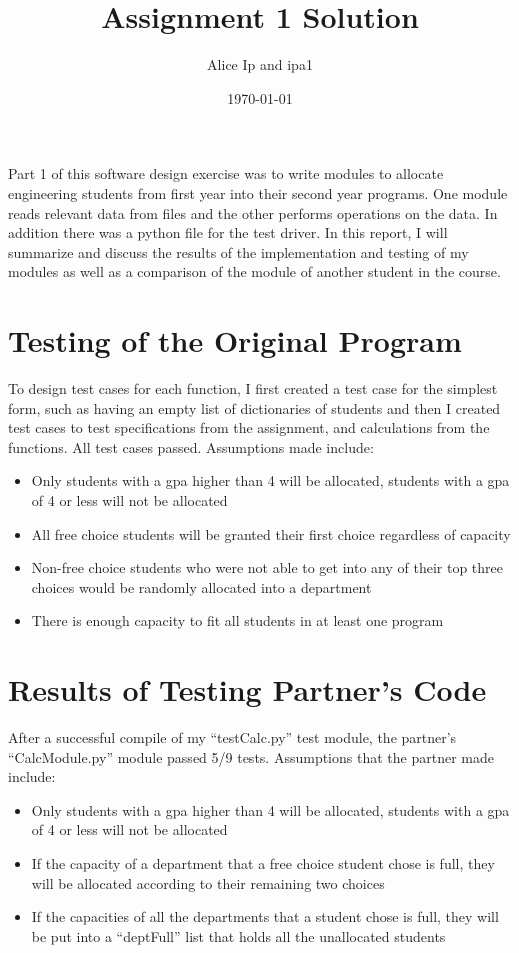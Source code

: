 \documentclass[12pt]{article}
\title{Assignment 1 Solution}
\author{Alice Ip and ipa1}
\date{\today}
\begin{document}
\maketitle

Part 1 of this software design exercise was to write modules to allocate engineering students from first year into their second year programs. One module reads relevant data from files and the other performs operations on the data. In addition there was a python file for the test driver. In this report, I will summarize and discuss the results of the implementation and testing of my modules as well as a comparison of the module of another student in the course.

\section{Testing of the Original Program}

To design test cases for each function, I first created a test case for the simplest form, such as having an empty list of dictionaries of students and then I created test cases to test specifications from the assignment, and calculations from the functions. All test cases passed. Assumptions made include:

\begin{itemize}
\item Only students with a gpa higher than 4 will be allocated, students with a gpa of 4 or less will not be allocated
\item All free choice students will be granted their first choice regardless of capacity
\item Non-free choice students who were not able to get into any of their top three choices would be randomly allocated into a department
\item There is enough capacity to fit all students in at least one program
\end{itemize}



\section{Results of Testing Partner's Code}

After a successful compile of my ``testCalc.py'' test module, the partner's ``CalcModule.py'' module passed 5/9 tests. Assumptions that the partner made include:

\begin{itemize}

\item Only students with a gpa higher than 4 will be allocated, students with a gpa of 4 or less will not be allocated
\item If the capacity of a department that a free choice student chose is full, they will be allocated according to their remaining two choices
\item If the capacities of all the departments that a student chose is full, they will be put into a ``deptFull'' list that holds all the unallocated students
\end{itemize}
\end{document}
